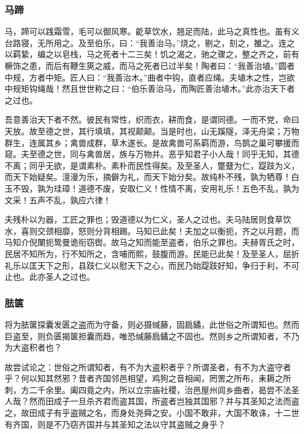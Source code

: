 \documentclass[]{article}
\begin{document}
\hypertarget{header-n197}{%
\subsubsection{马蹄}\label{header-n197}}

马，蹄可以践霜雪，毛可以御风寒。齕草饮水，翘足而陆，此马之真性也。虽有义台路寝，无所用之。及至伯乐，曰：``我善治马。''烧之，剔之，刻之，雒之。连之以羁絷，编之以皂栈，马之死者十二三矣！饥之渴之，驰之骤之，整之齐之，前有橛饰之患，而后有鞭生筴之威，而马之死者已过半矣！陶者曰：``我善治埴。''圆者中规，方者中矩。匠人曰：``我善治木。''曲者中钩，直者应绳。夫埴木之性，岂欲中规矩钩绳哉！然且世世称之曰：``伯乐善治马，而陶匠善治埴木。''此亦治天下者之过也。

吾意善治天下者不然。彼民有常性，织而衣，耕而食，是谓同德。一而不党，命曰天放。故至德之世，其行填填，其视颠颠。当是时也，山无蹊隧，泽无舟梁；万物群生，连属其乡；禽兽成群，草木遂长。是故禽兽可系羁而游，鸟鹊之巢可攀援而窥。夫至德之世，同与禽兽居，族与万物并。恶乎知君子小人哉！同乎无知，其德不离；同乎无欲，是谓素朴。素朴而民性得矣。及至圣人，蹩躠为仁，踶跂为义，而天下始疑矣。澶漫为乐，摘僻为礼，而天下始分矣。故纯朴不残，孰为牺尊！白玉不毁，孰为珪璋！道德不废，安取仁义！性情不离，安用礼乐！五色不乱，孰为文采！五声不乱，孰应六律！

夫残朴以为器，工匠之罪也；毁道德以为仁义，圣人之过也。夫马陆居则食草饮水，喜则交颈相靡，怒则分背相踢。马知已此矣！夫加之以衡扼，齐之以月题，而马知介倪闉扼鸷曼诡衔窃辔。故马之知而能至盗者，伯乐之罪也。夫赫胥氏之时，民居不知所为，行不知所之，含哺而熙，鼓腹而游。民能已此矣！及至圣人，屈折礼乐以匡天下之形，县跂仁义以慰天下之心，而民乃始踶跂好知，争归于利，不可止也。此亦圣人之过也。

\hypertarget{header-n204}{%
\subsubsection{胠箧}\label{header-n204}}

将为胠箧探囊发匮之盗而为守备，则必摄缄藤，固扃鐍，此世俗之所谓知也。然而巨盗至，则负匮揭箧担囊而趋，唯恐缄藤扃鐍之不固也。然则乡之所谓知者，不乃为大盗积者也？

故尝试论之：世俗之所谓知者，有不为大盗积者乎？所谓圣者，有不为大盗守者乎？何以知其然邪？昔者齐国邻邑相望，鸡狗之音相闻，罔罟之所布，耒耨之所刺，方二千余里。阖四竟之内，所以立宗庙社稷，治邑屋州闾乡曲者，曷尝不法圣人哉？然而田成子一旦杀齐君而盗其国，所盗者岂独其国邪？并与其圣知之法而盗之，故田成子有乎盗贼之名，而身处尧舜之安。小国不敢非，大国不敢诛，十二世有齐国，则是不乃窃齐国并与其圣知之法以守其盗贼之身乎？
\end{document}
